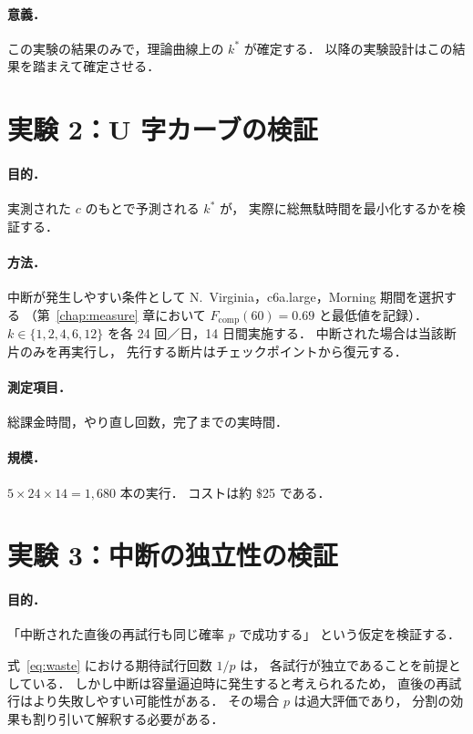 \documentclass[11pt,a4paper]{ltjsreport}
\newcommand{\Fcomp}{F_{\mathrm{comp}}}
\begin{document}
\paragraph{意義．}
この実験の結果のみで，理論曲線上の $k^{*}$ が確定する．
以降の実験設計はこの結果を踏まえて確定させる．

\section{実験 2：U 字カーブの検証}

\paragraph{目的．}
実測された $c$ のもとで予測される $k^{*}$ が，
実際に総無駄時間を最小化するかを検証する．

\paragraph{方法．}
中断が発生しやすい条件として
N.~Virginia，c6a.large，Morning 期間を選択する
（第~\ref{chap:measure} 章において $\Fcomp(60) = 0.69$ と最低値を記録）．
$k \in \{1,2,4,6,12\}$ を各 24 回／日，14 日間実施する．
中断された場合は当該断片のみを再実行し，
先行する断片はチェックポイントから復元する．

\paragraph{測定項目．}
総課金時間，やり直し回数，完了までの実時間．

\paragraph{規模．}
$5 \times 24 \times 14 = 1{,}680$ 本の実行．
コストは約 \$25 である．

\section{実験 3：中断の独立性の検証}

\paragraph{目的．}
「中断された直後の再試行も同じ確率 $p$ で成功する」
という仮定を検証する．

式~\eqref{eq:waste} における期待試行回数 $1/p$ は，
各試行が独立であることを前提としている．
しかし中断は容量逼迫時に発生すると考えられるため，
直後の再試行はより失敗しやすい可能性がある．
その場合 $p$ は過大評価であり，
分割の効果も割り引いて解釈する必要がある．
\end{document}
